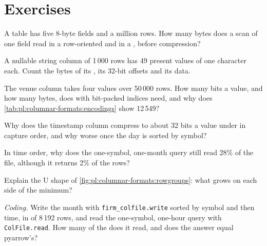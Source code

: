 \section{Exercises}

\begin{exercise}[$\star$]\label{exo:pl:columnar-formats:1}
A table has five 8-byte fields and a million rows. How many bytes does a scan of one field read in a row-oriented and in a
, before compression?
\end{exercise}

\begin{exercise}[$\star$]\label{exo:pl:columnar-formats:2}
A nullable string column of 1\,000 rows has 49 present values of one character each. Count the bytes of its , its
32-bit offsets and its data.
\end{exercise}

\begin{exercise}[$\star$]\label{exo:pl:columnar-formats:3}
The venue column takes four values over 50\,000 rows. How many bits a value, and how many bytes, does  with
bit-packed indices need, and why does \cref{tab:pl:columnar-formats:encodings} show 12\,549?
\end{exercise}

\begin{exercise}[$\star\star$]\label{exo:pl:columnar-formats:4}
Why does the timestamp column compress to about 32 bits a value under  in capture order, and why worse once the
day is sorted by symbol?
\end{exercise}

\begin{exercise}[$\star\star$]\label{exo:pl:columnar-formats:5}
In time order, why does the one-symbol, one-month query still read 28\% of the file, although it returns 2\% of the rows?
\end{exercise}

\begin{exercise}[$\star\star$]\label{exo:pl:columnar-formats:6}
Explain the U shape of \cref{fig:pl:columnar-formats:rowgroups}: what grows on each side of the minimum?
\end{exercise}

\begin{exercise}[$\star\star\star$]\label{exo:pl:columnar-formats:7}
\emph{Coding.} Write the month with \texttt{firm\_colfile.write} sorted by symbol and then time, in  of 8\,192 rows,
and read the one-symbol, one-hour query with \texttt{ColFile.read}. How many of the  does it read, and does the answer
equal pyarrow's?
\end{exercise}

